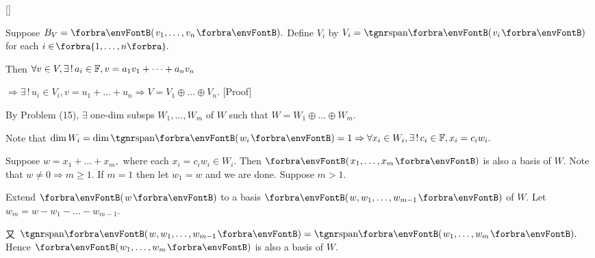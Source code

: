 \documentclass[a4paper, 11pt, UTF8]{article}
\begin{document}
\begin{large}
\hfill\ProblemBnoor[]{\Tips\;}[]{
	\Blind{\Tips\;} 
}\SepLine\pagebreak

\par\quad
Suppose $B_V=\Par{v_1,\dots,v_n}.$ Define $V_i$ by $V_i=\Span{v_i}$ for each $i\in\!\Bra{1,\dots,n}.$\par\quad
Then $\forall v\in V,\exists\,!\,a_i\in{\mathbb{F}},v=a_1 v_1+\dots+a_n v_n$\par\quad
{}$\Rightarrow\exists\,!\,u_i\in V_i,v=u_1+\dots+u_n\Rightarrow V=V_1\oplus\dots\oplus V_n.$\PfEnd
{}[Proof]\par\quad
By Problem (15), $\exists$ one-dim subsps $W_1,\dots,W_m$ of $W$ such that $W=W_1\oplus\dots\oplus W_m.$\par\quad
Note that $\dim W_i=\dim\Span{w_i}=1\Rightarrow\forall x_i\in W_i,\exists\,!\,c_i\in\Fbb,x_i=c_i w_i.$\par\quad
Suppose $w=x_1+\dots+x_m,$ where each $x_i=c_i w_i\in W_i.$ Then $\Par{x_1,\dots,x_m}$ is also a basis of $W.$\PfEnd\vspace{6pt}\quad
\Or Note that $w\neq 0\Rightarrow m\geqslant 1.$ If $m=1$ then let $w_1=w$ and we are done. Suppose $m>1.$\par\quad
Extend $\Par{w}$ to a basis $\Par{w,w_1,\dots,w_{m-1}}$ of $W.$ Let $w_m=w-w_1-\dots-w_{m-1}.$\par\quad
又 $\Span{w,w_1,\dots,w_{m-1}}=\Span{w_1,\dots,w_m}.$ Hence $\Par{w_1,\dots,w_m}$ is also a basis of $W.$\PfEnd
\SepLine


\end{large}
\end{document}
